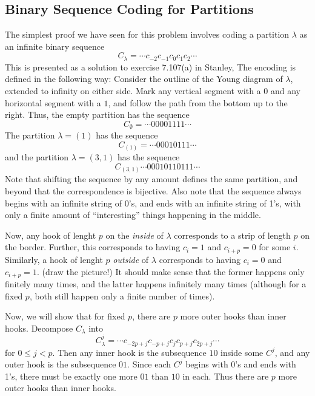 \documentclass{amsart}
\theoremstyle{definition}
\begin{document}
\subsection{Binary Sequence Coding for Partitions}
The simplest proof we have seen for this problem involves coding a
partition $\lambda$ as an infinite binary sequence
\[ C_\lambda = \cdots c_{-2}c_{-1}c_0c_1c_2 \cdots \]
This is presented as a solution to exercise 7.107(a) in Stanley, 
The encoding is defined in the following way: Consider the outline of
the Young diagram of $\lambda$, extended to infinity on either side.
Mark any vertical segment with a $0$ and any horizontal segment with a
$1$, and follow the path from the bottom up to the right.  Thus, the
empty partition has the sequence
\[ C_\emptyset = \cdots 00001111 \cdots \]
The partition $\lambda = (1)$ has the sequence
\[ C_{(1)} = \cdots 00010111 \cdots \]
and the partition $\lambda = (3, 1)$ has the sequence
\[ C_{(3, 1)}\cdots 00010110111 \cdots \]
Note that shifting the sequence by any amount defines the same
partition, and beyond that the correspondence is bijective.  Also note
that the sequence always begins with an infinite string of 0's, and
ends with an infinite string of 1's, with only a finite amount of
``interesting'' things happening in the middle.

Now, any hook of lenght $p$ on the \emph{inside} of $\lambda$
corresponds to a strip of length $p$ on the border.  Further, this
corresponds to having $c_i = 1$ and $c_{i+p} = 0$ for some $i$.
Similarly, a hook of lenght $p$ \emph{outside} of $\lambda$
corresponds to having $c_i = 0$ and $c_{i+p} = 1$.  (draw the
picture!)  It should make sense that the former happens only finitely
many times, and the latter happens infinitely many times (although for
a fixed $p$, both still happen only a finite number of times).

Now, we will show that for fixed $p$, there are $p$ more outer hooks
than inner hooks.  Decompose $C_\lambda$ into
\[ C^j_\lambda = \cdots c_{-2p+j}c_{-p+j}c_jc_{p+j}c_{2p+j}\cdots \]
for $0 \leq j < p$.  Then any inner hook is the subsequence $10$
inside some $C^j$, and any outer hook is the subsequence $01$.  Since
each $C^j$ begins with 0's and ends with 1's, there must be exactly
one more $01$ than $10$ in each.  Thus there are $p$ more outer hooks
than inner hooks.
\end{document}

